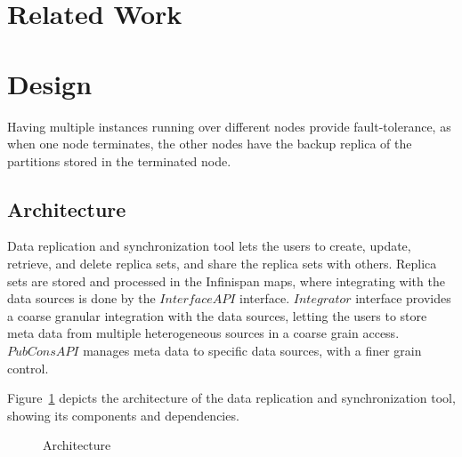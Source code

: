 \documentclass[conference]{IEEEtran}
\begin{document}
\section{Related Work}


\section{Design}
\balance
Having multiple instances running over different nodes provide fault-tolerance, as when one node terminates, the other nodes have the backup replica of the partitions stored in the terminated node. 

\subsection{Architecture}
Data replication and synchronization tool lets the users to create, update, retrieve, and delete replica sets, and share the replica sets with others. Replica sets are stored and processed in the Infinispan maps, where integrating with the data sources is done by the $InterfaceAPI$ interface. $Integrator$ interface provides a coarse granular integration with the data sources, letting the users to store meta data from multiple heterogeneous sources in a coarse grain access. $PubConsAPI$ manages meta data to specific data sources, with a finer grain control.

Figure~\ref{fig:arch} depicts the architecture of the data replication and synchronization tool, showing its components and dependencies.
\begin{figure}[!htbp]
\begin{center}
\end{center}
 \caption{Architecture}
 \label{fig:arch}
\end{figure}
\end{document}

